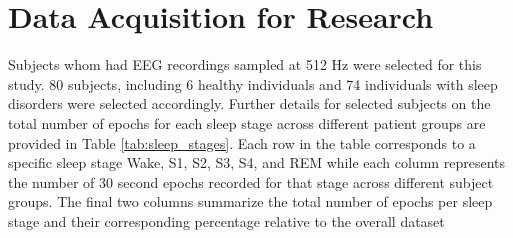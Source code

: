 \section{Data Acquisition for Research}
Subjects  whom had EEG recordings sampled at 512 Hz were selected for this study. 80 subjects, including 6 healthy individuals and 74 individuals with sleep disorders were selected accordingly. Further details for selected subjects on the total number of epochs for each sleep stage across different patient groups are provided in Table \ref{tab:sleep_stages}. Each row in the table corresponds to a specific sleep stage Wake, S1, S2, S3, S4, and REM while each column represents the number of 30 second epochs recorded for that stage across different subject groups. The final two columns summarize the total number of epochs per sleep stage and their corresponding percentage relative to the overall dataset \\

\begin{table}[H]
    \centering
    \caption{Sleep stage wise details of epoch distribution for selected subjects}
    \label{tab:sleep_stages}
\end{table}


